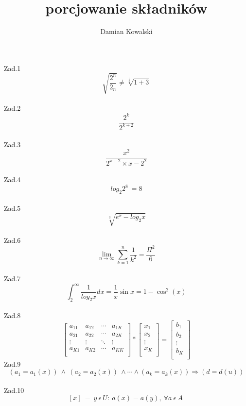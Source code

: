 \documentclass[12pt, letterpaper, titlepage]{article}
\title{porcjowanie składników}
\author{Damian Kowalski}
\begin{document}
\maketitle
\newpage

Zad.1
$$ \sqrt{ \frac{2^n}{2_n}} \neq \sqrt[\frac{1}{3}]{1+3}$$\\
Zad.2
$$ \frac{2^k}{2^{k+2}} $$\\
Zad.3
$$ \frac{x^2}{2^{x+2}\times{x-2}^2}$$\\
Zad.4
$$ log_2 2^8 \ = 8 $$\\
Zad.5
$$ \sqrt[3]{e^x - log_2 x} $$\\
Zad.6
$$ \lim_{n\rightarrow\infty} \sum^{n}_{k=1} \frac{1}{k^2} = \frac{\Pi^2}{6} $$\\
Zad.7
$$ \int^\infty_{2} \frac{1}{log_2 x}dx = \frac{1}{x} \sin x = 1 - \cos^2 (x) $$\\
Zad.8
$$
\left[
\begin{array}{cccc}
a_{11} & a_{12} & \cdots & a_{1K}\\
a_{21} & a_{22} & \cdots & a_{2K}\\
\vdots & \vdots & \ddots & \vdots\\
a_{K1} & a_{K2} & \cdots & a_{KK}\\
\end{array}
\right]
*
\left[
\begin{array}{c}
x_1\\
x_2\\
\vdots\\
x_K\\
\end{array}
\right]
=
\left[
\begin{array}{c}
b_1\\
b_2\\
\vdots\\
b_K\\
\end{array}
\right]
$$
Zad.9
$$(a_1 = a_1 (x)) \ \wedge \  (a_2 = a_2 (x)) \ \wedge \cdots \wedge (a_k = a_k (x)) \Rightarrow (d = d (u)) $$\\
Zad.10
$$ \left[ x \right] \ = \ y \ \epsilon \ U : \ a(x)=a(y), \ \forall a \ \epsilon \ A \  $$
\end{document}
